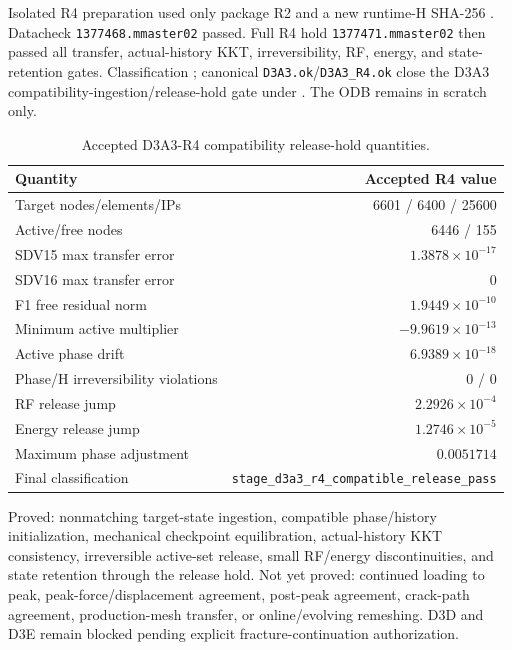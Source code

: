 \documentclass[11pt,a4paper]{article}
\begin{document}
Isolated R4 preparation used only package R2 and a new runtime-H SHA-256
.
Datacheck \texttt{1377468.mmaster02} passed. Full R4 hold
\texttt{1377471.mmaster02} then passed all transfer, actual-history KKT,
irreversibility, RF, energy, and state-retention gates. Classification
; canonical
\texttt{D3A3.ok}/\texttt{D3A3\_R4.ok} close the D3A3
compatibility-ingestion/release-hold gate under
. The ODB remains in scratch only.

\begin{table}[ht]
\centering
\caption{Accepted D3A3-R4 compatibility release-hold quantities.}
\begin{tabular}{lr}
\hline
Quantity & Accepted R4 value \\
\hline
Target nodes/elements/IPs & 6601 / 6400 / 25600 \\
Active/free nodes & 6446 / 155 \\
SDV15 max transfer error & $1.3878\times10^{-17}$ \\
SDV16 max transfer error & $0$ \\
F1 free residual norm & $1.9449\times10^{-10}$ \\
Minimum active multiplier & $-9.9619\times10^{-13}$ \\
Active phase drift & $6.9389\times10^{-18}$ \\
Phase/H irreversibility violations & $0$ / $0$ \\
RF release jump & $2.2926\times10^{-4}$ \\
Energy release jump & $1.2746\times10^{-5}$ \\
Maximum phase adjustment & $0.0051714$ \\
Final classification & \texttt{stage\_d3a3\_r4\_compatible\_release\_pass} \\
\hline
\end{tabular}
\end{table}

Proved: nonmatching target-state ingestion, compatible phase/history
initialization, mechanical checkpoint equilibration, actual-history KKT
consistency, irreversible active-set release, small RF/energy discontinuities,
and state retention through the release hold. Not yet proved: continued loading
to peak, peak-force/displacement agreement, post-peak agreement, crack-path
agreement, production-mesh transfer, or online/evolving remeshing. D3D and D3E
remain blocked pending explicit fracture-continuation authorization.
\end{document}

